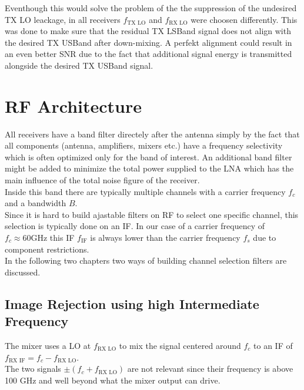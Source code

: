 Eventhough this would solve the problem of the the suppression of the
undesired \gls{TX} \gls{LO} leackage, in all receivers
$f_{\text{TX LO}}$ and $f_{\text{RX LO}}$ were choosen differently.
This was done to make sure that the residual \gls{TX} \gls{LSBand}
signal does not align with the desired \gls{TX} \gls{USBand} after
down-mixing. A perfekt alignment could result in an even better
\gls{SNR} due to the fact that additional signal energy is transmitted
alongside the desired \gls{TX} \gls{USBand} signal. \\

\section{RF Architecture}
All receivers have a band filter directely after the antenna simply by the
fact that all components (antenna, amplifiers, mixers etc.) have a frequency
selectivity which is often optimized only for the band of interest.
An additional band filter might be added to minimize the total power supplied
to the \gls{LNA} which has the main influence of the total noise figure of
the receiver. \\

Inside this band there are typically multiple channels with a carrier frequency
$f_c$ and a bandwidth $B$. \\

Since it is hard to build ajastable filters on \gls{RF} to select one specific
channel, this selection is typically done on an \gls{IF}. In our case of a
carrier frequency of $f_c \approx 60 \text{GHz}$ this \gls{IF} $f_{\text{IF}}$
is always lower than the carrier frequency $f_s$ due to component restrictions. \\

In the following two chapters two ways of building channel selection filters
are discussed. \\

\subsection{Image Rejection using high Intermediate Frequency}
\label{sec:rx_rf_0}
The mixer uses a \gls{LO} at $f_{\text{RX LO}}$ to mix the signal centered around
$f_{c}$ to an \gls{IF} of $f_{\text{RX IF}} = f_{c} - f_{\text{RX LO}}$. \\

The two signals $\pm (f_{c} + f_{\text{RX LO}})$ are not relevant since their
frequency is above 100 GHz and well beyond what the mixer output can drive. \\

